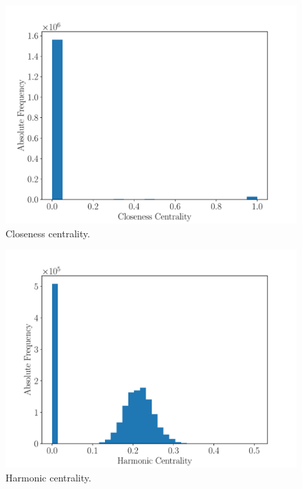 \documentclass[9pt,a4paper,twocolumn,notitlepage]{article}
\begin{document}
\begin{figure}[h]
	\centering
	\includegraphics[width=\linewidth]{wikipedia_pt_closeness_centrality.pdf}
	\caption{Closeness centrality.}
	\label{fig:closeness}
\end{figure}

\begin{figure}[h]
	\centering
	\includegraphics[width=\linewidth]{wikipedia_pt_harmonic_centrality.pdf}
	\caption{Harmonic centrality.}
	\label{fig:harmonic}
\end{figure}
\end{document}
